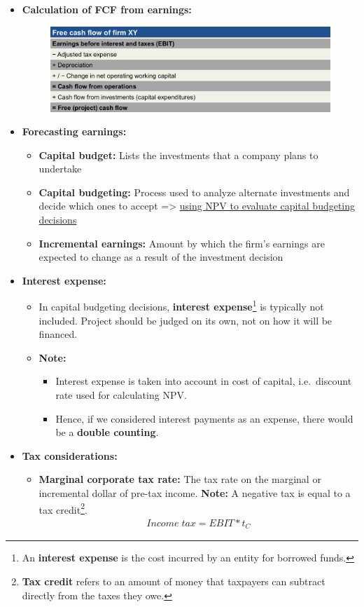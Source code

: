 \documentclass[ieeetran]{article}
\begin{document}
\begin{itemize}
\item \textbf{Calculation of FCF from earnings:}
	\begin{figure}[h!]
	  \centering
	  \includegraphics[width=1.0\linewidth]{FCFearnings.jpg}
	  \label{fig:fCFearnings_jpg}
	\end{figure}

\item \textbf{Forecasting earnings:}
	\begin{itemize}
	  \item \textbf{Capital budget:} Lists the investments that a company plans to undertake
	  \item \textbf{Capital budgeting:} Process used to analyze alternate investments and decide which ones to accept => \underline{using NPV to evaluate capital budgeting decisions}
	  \item \textbf{Incremental earnings:}  Amount by which the firm's earnings are expected to change as a result of the investment decision
 
	\end{itemize}
\item \textbf{Interest expense:}
	\begin{itemize}
		\item In capital budgeting decisions, \textbf{interest expense}\footnote{An \textbf{interest expense} is the cost incurred by an entity for borrowed funds.} is typically not included. Project should be judged on its own, not on how it will be financed.
			\item \textbf{Note:}
				\begin{itemize}
				  \item Interest expense is taken into account in cost of capital, i.e.\ discount rate used for calculating NPV.
				\item Hence, if we considered interest payments as an expense, there would be a \textbf{double counting}.
				\end{itemize}
	\end{itemize}
	\item \textbf{Tax considerations:}
		\begin{itemize}
			\item \textbf{Marginal corporate tax rate:} The tax rate on the marginal or incremental dollar of pre-tax income. \textbf{Note:} A negative tax is equal to a tax credit\footnote{\textbf{Tax credit} refers to an amount of money that taxpayers can subtract directly from the taxes they owe.}.
				\large
				\begin{equation*}
				\begin{aligned}
				\boxed{
				Income \; tax = EBIT * t_C
				}
			\end{aligned}
				\end{equation*}
				\normalsize
			

\end{itemize}
\end{itemize}
\end{document}
